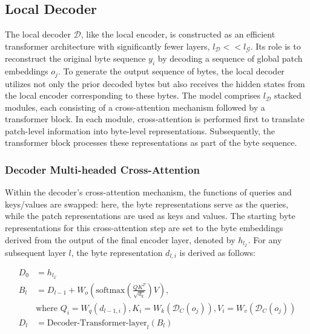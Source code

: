 \subsection{Local Decoder} 

The local decoder $\mathcal{D}$, like the local encoder, is constructed as an efficient transformer architecture with significantly fewer layers, $l_{\mathcal{D}} << l_{\mathcal{G}}$. Its role is to reconstruct the original byte sequence $y_i$ by decoding a sequence of global patch embeddings $o_j$. To generate the output sequence of bytes, the local decoder utilizes not only the prior decoded bytes but also receives the hidden states from the local encoder corresponding to these bytes. The model comprises $l_{\mathcal{D}}$ stacked modules, each consisting of a cross-attention mechanism followed by a transformer block. In each module, cross-attention is performed first to translate patch-level information into byte-level representations. Subsequently, the transformer block processes these representations as part of the byte sequence.

\subsubsection{Decoder Multi-headed Cross-Attention} 

Within the decoder’s cross-attention mechanism, the functions of queries and keys/values are swapped: here, the byte representations serve as the queries, while the patch representations are used as keys and values. The starting byte representations for this cross-attention step are set to the byte embeddings derived from the output of the final encoder layer, denoted by $h_{l_{\mathcal{E}}}$. For any subsequent layer $l$, the byte representation $d_{l,i}$ is derived as follows:

\begin{align}
D_0 &= h_{l_{\mathcal{E}}} \\
B_l &= D_{l-1} + W_o\left(\text{softmax}\left(\frac{QK^T}{\sqrt{d_k}}\right)V\right), \\
  &\text{where } Q_i = W_q(d_{l-1,i}), K_i = W_k(\mathcal{D}_C(o_j)), V_i = W_v(\mathcal{D}_C(o_j)) \\
  D_l &= \text{Decoder-Transformer-layer}_l(B_l)
\end{align}


